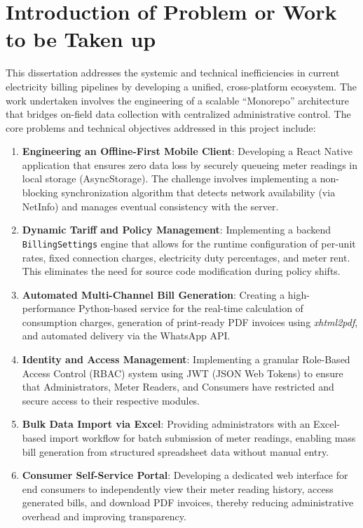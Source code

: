 \documentclass[12pt, a4paper, onecolumn]{report}
\begin{document}
\section{Introduction of Problem or Work to be Taken up}
This dissertation addresses the systemic and technical inefficiencies in current electricity billing pipelines by developing a unified, cross-platform ecosystem. The work undertaken involves the engineering of a scalable ``Monorepo'' architecture that bridges on-field data collection with centralized administrative control. The core problems and technical objectives addressed in this project include:
\begin{enumerate}
    \item \textbf{Engineering an Offline-First Mobile Client}: Developing a React Native application that ensures zero data loss by securely queueing meter readings in local storage (AsyncStorage). The challenge involves implementing a non-blocking synchronization algorithm that detects network availability (via NetInfo) and manages eventual consistency with the server.
    \item \textbf{Dynamic Tariff and Policy Management}: Implementing a backend \texttt{BillingSettings} engine that allows for the runtime configuration of per-unit rates, fixed connection charges, electricity duty percentages, and meter rent. This eliminates the need for source code modification during policy shifts.
    \item \textbf{Automated Multi-Channel Bill Generation}: Creating a high-performance Python-based service for the real-time calculation of consumption charges, generation of print-ready PDF invoices using \textit{xhtml2pdf}, and automated delivery via the WhatsApp API.
    \item \textbf{Identity and Access Management}: Implementing a granular Role-Based Access Control (RBAC) system using JWT (JSON Web Tokens) to ensure that Administrators, Meter Readers, and Consumers have restricted and secure access to their respective modules.
    \item \textbf{Bulk Data Import via Excel}: Providing administrators with an Excel-based import workflow for batch submission of meter readings, enabling mass bill generation from structured spreadsheet data without manual entry.
    \item \textbf{Consumer Self-Service Portal}: Developing a dedicated web interface for end consumers to independently view their meter reading history, access generated bills, and download PDF invoices, thereby reducing administrative overhead and improving transparency.
\end{enumerate}
\end{document}
